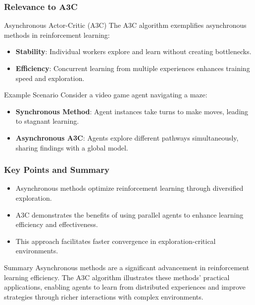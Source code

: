 \documentclass{beamer}
\begin{document}
\begin{frame}[fragile]
    \frametitle{Relevance to A3C}
    \begin{block}{Asynchronous Actor-Critic (A3C)}
        The A3C algorithm exemplifies asynchronous methods in reinforcement learning:
        \begin{itemize}
            \item \textbf{Stability}: Individual workers explore and learn without creating bottlenecks.
            \item \textbf{Efficiency}: Concurrent learning from multiple experiences enhances training speed and exploration.
        \end{itemize}
    \end{block}
    
    \begin{block}{Example Scenario}
        Consider a video game agent navigating a maze:
        \begin{itemize}
            \item \textbf{Synchronous Method}: Agent instances take turns to make moves, leading to stagnant learning.
            \item \textbf{Asynchronous A3C}: Agents explore different pathways simultaneously, sharing findings with a global model.
        \end{itemize}
    \end{block}
\end{frame}

\begin{frame}[fragile]
    \frametitle{Key Points and Summary}
    \begin{itemize}
        \item Asynchronous methods optimize reinforcement learning through diversified exploration.
        \item A3C demonstrates the benefits of using parallel agents to enhance learning efficiency and effectiveness.
        \item This approach facilitates faster convergence in exploration-critical environments.
    \end{itemize}
    
    \begin{block}{Summary}
        Asynchronous methods are a significant advancement in reinforcement learning efficiency. The A3C algorithm illustrates these methods’ practical applications, enabling agents to learn from distributed experiences and improve strategies through richer interactions with complex environments.
    \end{block}
\end{frame}
\end{document}

